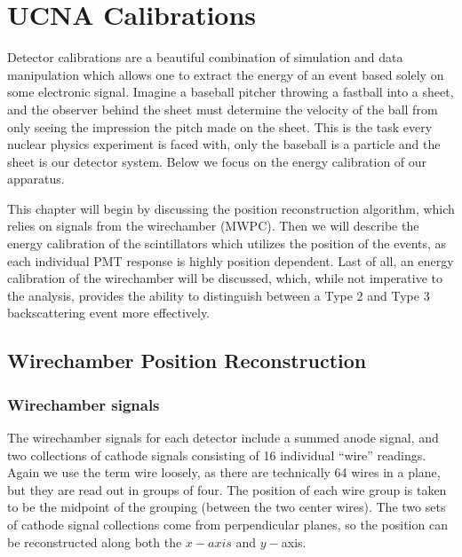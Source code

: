 \chapter{UCNA Calibrations}
\label{ch:UCNA_Calibrations}

Detector calibrations are a beautiful combination
of simulation and data manipulation which allows one to extract the energy of
an event based solely on some electronic signal. Imagine a baseball pitcher
throwing a fastball into a sheet, and the observer behind the sheet must
determine the velocity of the ball from only seeing the impression the pitch
made on the sheet. This is the task every nuclear physics experiment is faced
with, only the baseball is a particle and the sheet is our detector system.
Below we focus on the energy calibration of our apparatus.

This chapter will begin by discussing the position reconstruction algorithm,
which relies on signals from the wirechamber (MWPC). Then we will describe
the energy calibration of the scintillators which utilizes the
position of the events, as each individual PMT response is highly position
dependent. Last of all, an energy calibration of the wirechamber will be
discussed, which, while not imperative to the analysis, provides the ability to
distinguish between a Type 2 and Type 3 backscattering event more
effectively.




\section{Wirechamber Position Reconstruction}

\subsection{Wirechamber signals}

The wirechamber signals for each detector include a summed anode signal, and two collections of
cathode signals consisting of 16 individual ``wire'' readings. Again we use the term
wire loosely, as there are technically 64 wires in a plane, but they are read out in groups
of four. The position of each wire group is taken to be the midpoint of the grouping (between
the two center wires). The two sets of cathode signal collections come from perpendicular
planes, so the position can be reconstructed along both the $x-axis$ and $y-$axis.


